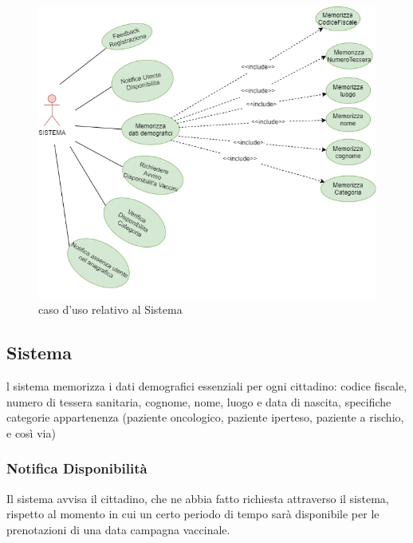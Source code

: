 \documentclass[a4paper,12pt,openany,oneside]{book}
\begin{document}
\begin{figure}[h] 
\centering
\includegraphics[width=0.6\columnwidth]{sistema.png} 
\caption{caso d'uso relativo al Sistema} 
\end{figure}

\subsection*{Sistema}
l sistema memorizza i dati demografici essenziali per ogni cittadino: codice fiscale, numero di
tessera sanitaria, cognome, nome, luogo e data di nascita, specifiche categorie appartenenza
(paziente oncologico, paziente iperteso, paziente a rischio, e così via)\\
\subsubsection*{Notifica Disponibilità}
Il sistema avvisa il cittadino, che ne abbia fatto richiesta attraverso il sistema, rispetto al momento in cui un certo periodo di tempo sarà disponibile per le prenotazioni di una data campagna vaccinale.\\
\end{document}

